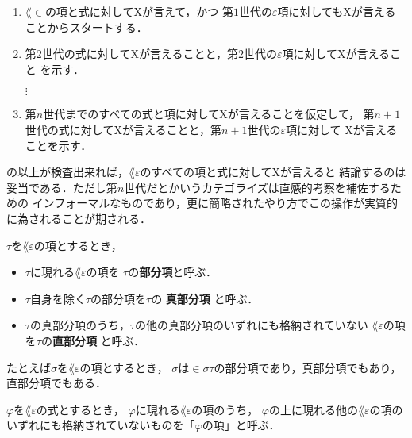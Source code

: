 	\begin{enumerate}
		\item $\lang{\in}$の項と式に対してXが言えて，かつ
			第$1$世代の$\varepsilon$項に対してもXが言えることからスタートする．
		\item 第$2$世代の式に対してXが言えることと，第$2$世代の$\varepsilon$項に対してXが言えること
			を示す．
			
			$\vdots$
			
		\item 第$n$世代までのすべての式と項に対してXが言えることを仮定して，
			第$n+1$世代の式に対してXが言えることと，第$n+1$世代の$\varepsilon$項に対して
			Xが言えることを示す．
	\end{enumerate}
	の以上が検査出来れば，$\lang{\varepsilon}$のすべての項と式に対してXが言えると
	結論するのは妥当である．ただし第$n$世代だとかいうカテゴライズは直感的考察を補佐するための
	インフォーマルなものであり，更に簡略されたやり方でこの操作が実質的に為されることが期される．
	
	\begin{screen}
		\begin{metadfn}
		\label{metadfn:L_epsilon_subterm_of_term}
			$\tau$を$\lang{\varepsilon}$の項とするとき，
			\begin{itemize}
				\item $\tau$に現れる$\lang{\varepsilon}$の項を
					$\tau$の{\bf 部分項}と呼ぶ．
				\item $\tau$自身を除く$\tau$の部分項を$\tau$の
					{\bf 真部分項}
					と呼ぶ．
				\item $\tau$の真部分項のうち，$\tau$の他の真部分項のいずれにも格納されていない
					$\lang{\varepsilon}$の項を$\tau$の{\bf 直部分項}
					と呼ぶ．
			\end{itemize}
		\end{metadfn}
	\end{screen}
	
	たとえば$\sigma$を$\lang{\varepsilon}$の項とするとき，
	$\sigma$は$\in \sigma \tau$の部分項であり，真部分項でもあり，直部分項でもある．
	
	\begin{screen}
		\begin{metadfn}
		\label{metadfn:L_epsilon_term_of_formula}
			$\varphi$を$\lang{\varepsilon}$の式とするとき，
			$\varphi$に現れる$\lang{\varepsilon}$の項のうち，
			$\varphi$の上に現れる他の$\lang{\varepsilon}$の項の
			いずれにも格納されていないものを「$\varphi$の項」と呼ぶ．
		\end{metadfn}
	\end{screen}
	

